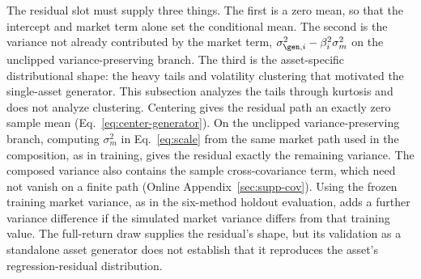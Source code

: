 The residual slot must supply three things. The first is a zero mean,
so that the intercept and market term alone set the conditional
mean. The second is the variance not already contributed by the
market term, $\sigma_{\gen,i}^2 - \beta_i^2 \sigma_m^2$ on the
unclipped variance-preserving branch. The third is the asset-specific
distributional shape: the heavy tails and volatility clustering that
motivated the single-asset generator. This subsection analyzes the
tails through kurtosis and does not analyze clustering. Centering
gives the residual path an exactly zero sample mean
(Eq.~\eqref{eq:center-generator}). On the unclipped variance-preserving
branch, computing $\sigma_m^2$ in Eq.~\eqref{eq:scale} from the same
market path used in the composition, as in training, gives the
residual exactly the remaining variance. The composed variance also
contains the sample cross-covariance term, which need not vanish on a
finite path (Online Appendix~\ref{sec:supp-cov}). Using the frozen
training market variance, as in the six-method holdout evaluation,
adds a further variance difference if the simulated market variance
differs from that training value. The full-return draw supplies the
residual's shape, but its validation as a standalone asset generator
does not establish that it reproduces the asset's regression-residual
distribution.

